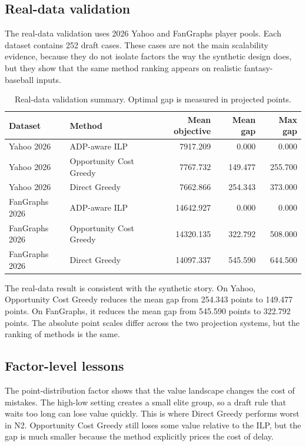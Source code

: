 \documentclass[10pt,a4paper]{article}
\begin{document}
\subsection{Real-data validation}

The real-data validation uses 2026 Yahoo and FanGraphs player pools. Each dataset contains 252 draft cases. These cases are not the main scalability evidence, because they do not isolate factors the way the synthetic design does, but they show that the same method ranking appears on realistic fantasy-baseball inputs.

\begin{table}[H]
\centering
\small
\caption{Real-data validation summary. Optimal gap is measured in projected points.}
\label{tab:real_data}
\begin{tabular}{llrrr}
\toprule
Dataset & Method & Mean objective & Mean gap & Max gap \\
\midrule
Yahoo 2026 & ADP-aware ILP & 7917.209 & 0.000 & 0.000 \\
Yahoo 2026 & Opportunity Cost Greedy & 7767.732 & 149.477 & 255.700 \\
Yahoo 2026 & Direct Greedy & 7662.866 & 254.343 & 373.000 \\
\midrule
FanGraphs 2026 & ADP-aware ILP & 14642.927 & 0.000 & 0.000 \\
FanGraphs 2026 & Opportunity Cost Greedy & 14320.135 & 322.792 & 508.000 \\
FanGraphs 2026 & Direct Greedy & 14097.337 & 545.590 & 644.500 \\
\bottomrule
\end{tabular}
\end{table}

The real-data result is consistent with the synthetic story. On Yahoo, Opportunity Cost Greedy reduces the mean gap from 254.343 points to 149.477 points. On FanGraphs, it reduces the mean gap from 545.590 points to 322.792 points. The absolute point scales differ across the two projection systems, but the ranking of methods is the same.

\subsection{Factor-level lessons}

The point-distribution factor shows that the value landscape changes the cost of mistakes. The high-low setting creates a small elite group, so a draft rule that waits too long can lose value quickly. This is where Direct Greedy performs worst in N2. Opportunity Cost Greedy still loses some value relative to the ILP, but the gap is much smaller because the method explicitly prices the cost of delay.
\end{document}
